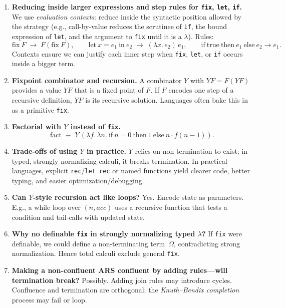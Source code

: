 \documentclass{article}
\theoremstyle{theorem}
\theoremstyle{definition}
\theoremstyle{remark}
\begin{document}
\begin{enumerate}
  \item \textbf{Reducing inside larger expressions and step rules for \texttt{fix}, \texttt{let}, \texttt{if}.}
  We use \emph{evaluation contexts}: reduce inside the syntactic position allowed by the strategy (e.g., call-by-value reduces the scrutinee of \texttt{if}, the bound expression of \texttt{let}, and the argument to \texttt{fix} until it is a $\lambda$). Rules:
  \[
  \mathrm{fix}\ F \;\to\; F(\mathrm{fix}\ F),\qquad
  \mathrm{let}\ x=e_1\ \mathrm{in}\ e_2 \;\to\; (\lambda x.\,e_2)\,e_1,\qquad
  \mathrm{if}\ \text{true}\ \text{then}\ e_1\ \text{else}\ e_2 \to e_1.
  \]
  Contexts ensure we can justify each inner step when \texttt{fix}, \texttt{let}, or \texttt{if} occurs inside a bigger term.

  \item \textbf{Fixpoint combinator and recursion.}
  A combinator $Y$ with $YF = F(YF)$ provides a value $YF$ that is a fixed point of $F$. If $F$ encodes one step of a recursive definition, $YF$ is its recursive solution. Languages often bake this in as a primitive \texttt{fix}.

  \item \textbf{Factorial with $Y$ instead of \texttt{fix}.}
  \[
  \mathrm{fact} \;\equiv\; Y\,(\lambda f.\,\lambda n.\ \mathrm{if}\ n=0\ \mathrm{then}\ 1\ \mathrm{else}\ n \cdot f(n-1)).
  \]

  \item \textbf{Trade-offs of using $Y$ in practice.}
  $Y$ relies on non-termination to exist; in typed, strongly normalizing calculi, it breaks termination. In practical languages, explicit \texttt{rec}/\texttt{let rec} or named functions yield clearer code, better typing, and easier optimization/debugging.

  \item \textbf{Can $Y$-style recursion act like loops?}
  Yes. Encode state as parameters. E.g., a while loop over $(n,acc)$ uses a recursive function that tests a condition and tail-calls with updated state.

  \item \textbf{Why no definable \texttt{fix} in strongly normalizing typed $\lambda$?}
  If \texttt{fix} were definable, we could define a non-terminating term $\,\Omega$, contradicting strong normalization. Hence total calculi exclude general \texttt{fix}.

  \item \textbf{Making a non-confluent ARS confluent by adding rules—will termination break?}
  Possibly. Adding join rules may introduce cycles. Confluence and termination are orthogonal; the \emph{Knuth–Bendix completion} process may fail or loop.


\end{enumerate}
\end{document}
